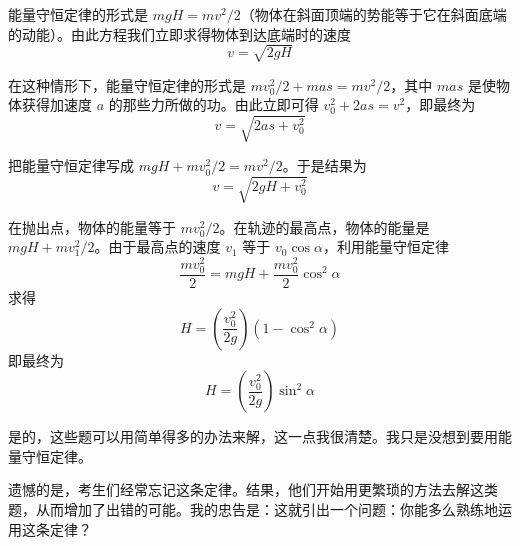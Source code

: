 \begin{dialogue}
\begin{description}[leftmargin=1cm, style=nextline]
\item[第一个问题。] 能量守恒定律的形式是 $mgH = mv^{2}/2$（物体在斜面顶端的势能等于它在斜面底端的动能）。由此方程我们立即求得物体到达底端时的速度
\begin{equation*}
v = \sqrt{2gH}
\end{equation*}


\item[第二个问题。] 在这种情形下，能量守恒定律的形式是
$mv_{0}^{2}/2+mas= mv^{2}/2$，其中 $mas$ 是使物体获得加速度 $a$ 的那些力所做的功。由此立即可得 $v_{0}^{2} + 2as = v^{2}$，即最终为
\begin{equation*}
v=\sqrt{2as+v_{0}^{2}}
\end{equation*}

\item[第三个问题。] 把能量守恒定律写成 $mgH+mv_{0}^{2}/2= mv^{2}/2$。于是结果为
\begin{equation*}
v=\sqrt{2gH+v_{0}^{2}}
\end{equation*}

\item[第四个问题。] 在抛出点，物体的能量等于 $mv_{0}^{2}/2$。在轨迹的最高点，物体的能量是 $mgH+mv_{1}^{2}/2$。由于最高点的速度 $v_{1}$ 等于 $v_{0} \cos \alpha$，利用能量守恒定律
\begin{equation*}
\frac{mv_{0}^{2}}{2} = mgH + \frac{mv_{0}^{2}}{2} \cos^{2} \alpha
\end{equation*}
求得
\begin{equation*}
H=\left(\frac{v_{0}^{2}}{2g} \right) \left( 1 - \cos^{2} \alpha \right)
\end{equation*}
即最终为
\begin{equation*}
H=\left(\frac{v_{0}^{2}}{2g} \right) \sin^{2} \alpha
\end{equation*}
\end{description}

\stda 是的，这些题可以用简单得多的办法来解，这一点我很清楚。我只是没想到要用能量守恒定律。

\tchr 遗憾的是，考生们经常忘记这条定律。结果，他们开始用更繁琐的方法去解这类题，从而增加了出错的可能。我的忠告是：这就引出一个问题：你能多么熟练地运用这条定律？


\end{dialogue}
